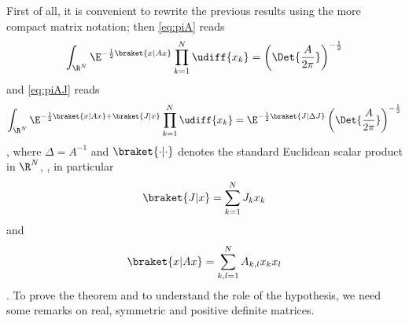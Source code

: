First of all,  it is convenient to rewrite the previous results using the more
compact matrix notation;
then \cref{eq:piA} reads
\begin{dmath}[label={piAmat}]
   \int_{\R^{N}} \E^{-\frac{1}{2} \braket{ x | Ax}  } \prod_{k=1}^{N}
   \udiff{x_{k}} = \left( \Det{ \frac{A}{2\pi}} \right)^{-\frac{1}{2}} 
\end{dmath}
and \cref{eq:piAJ} reads
\begin{dmath}[label={piAJmat}]
   \int_{\R^{N}} \E^{-\frac{1}{2} \braket{ x | Ax}  + \braket{J|x} } \prod_{k=1}^{N}
   \udiff{x_{k}} = \E^{-\frac{1}{2} \braket{J| \Delta J}} \left( \Det{ \frac{A}{2\pi}} \right)^{-\frac{1}{2}} 
\end{dmath},
where $\Delta = A^{-1}$ and $\braket{\cdot|\cdot}$ denotes the standard
Euclidean scalar product in $\R^{N}$, \ie, in particular
\begin{dmath*}
   \braket{J|x} = \sum_{k=1}^{N} J_{k} x_{k}
\end{dmath*}
and 
\begin{dmath*}
   \braket{x|Ax} = \sum_{k,l=1}^{N} A_{k,l} x_{k} x_{l}
\end{dmath*}.
To prove the theorem and to understand the role of the hypothesis, we need some remarks on real, symmetric and positive
definite matrices.

